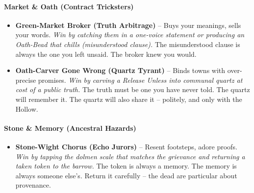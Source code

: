 \paragraph{Market \& Oath (Contract Tricksters)}
\begin{itemize}
\item \textbf{Green-Market Broker (Truth Arbitrage)} -- Buys your meanings, sells your words. \emph{Win by catching them in a one-voice statement or producing an Oath-Bead that chills (misunderstood clause).} The misunderstood clause is always the one you left unsaid. The broker knew you would.
\item \textbf{Oath-Carver Gone Wrong (Quartz Tyrant)} -- Binds towns with over-precise promises. \emph{Win by carving a \emph{Release Unless} into communal quartz at cost of a public truth.} The truth must be one you have never told. The quartz will remember it. The quartz will also share it -- politely, and only with the Hollow.
\end{itemize}

\paragraph{Stone \& Memory (Ancestral Hazards)}
\begin{itemize}
\item \textbf{Stone-Wight Chorus (Echo Jurors)} -- Resent footsteps, adore proofs. \emph{Win by tapping the dolmen scale that matches the grievance and returning a taken token to the barrow.} The token is always a memory. The memory is always someone else's. Return it carefully -- the dead are particular about provenance.
\end{itemize}

